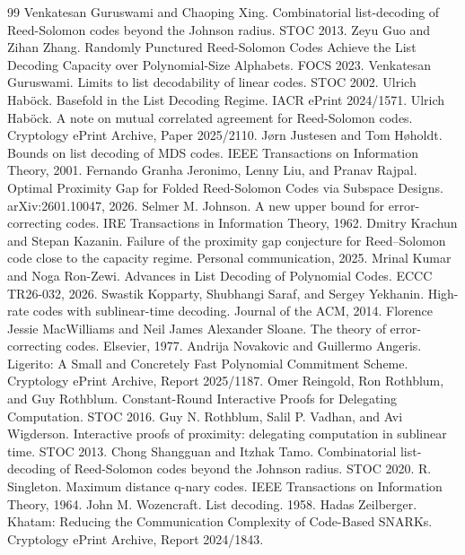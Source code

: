 \documentclass[11pt]{article}
\theoremstyle{plain}
\theoremstyle{definition}
\begin{document}
\begin{thebibliography}{99}
 Venkatesan Guruswami and Chaoping Xing. Combinatorial list-decoding of Reed-Solomon codes beyond the Johnson radius. STOC 2013.
 Zeyu Guo and Zihan Zhang. Randomly Punctured Reed-Solomon Codes Achieve the List Decoding Capacity over Polynomial-Size Alphabets. FOCS 2023.
 Venkatesan Guruswami. Limits to list decodability of linear codes. STOC 2002.
 Ulrich Hab\"ock. Basefold in the List Decoding Regime. IACR ePrint 2024/1571.
 Ulrich Hab\"ock. A note on mutual correlated agreement for Reed-Solomon codes. Cryptology ePrint Archive, Paper 2025/2110.
 J\o{}rn Justesen and Tom H\o{}holdt. Bounds on list decoding of MDS codes. IEEE Transactions on Information Theory, 2001.
 Fernando Granha Jeronimo, Lenny Liu, and Pranav Rajpal. Optimal Proximity Gap for Folded Reed-Solomon Codes via Subspace Designs. arXiv:2601.10047, 2026.
 Selmer M. Johnson. A new upper bound for error-correcting codes. IRE Transactions in Information Theory, 1962.
 Dmitry Krachun and Stepan Kazanin. Failure of the proximity gap conjecture for Reed--Solomon code close to the capacity regime. Personal communication, 2025.
 Mrinal Kumar and Noga Ron-Zewi. Advances in List Decoding of Polynomial Codes. ECCC TR26-032, 2026.
 Swastik Kopparty, Shubhangi Saraf, and Sergey Yekhanin. High-rate codes with sublinear-time decoding. Journal of the ACM, 2014.
 Florence Jessie MacWilliams and Neil James Alexander Sloane. The theory of error-correcting codes. Elsevier, 1977.
 Andrija Novakovic and Guillermo Angeris. Ligerito: A Small and Concretely Fast Polynomial Commitment Scheme. Cryptology ePrint Archive, Report 2025/1187.
 Omer Reingold, Ron Rothblum, and Guy Rothblum. Constant-Round Interactive Proofs for Delegating Computation. STOC 2016.
 Guy N. Rothblum, Salil P. Vadhan, and Avi Wigderson. Interactive proofs of proximity: delegating computation in sublinear time. STOC 2013.
 Chong Shangguan and Itzhak Tamo. Combinatorial list-decoding of Reed-Solomon codes beyond the Johnson radius. STOC 2020.
 R. Singleton. Maximum distance q-nary codes. IEEE Transactions on Information Theory, 1964.
 John M. Wozencraft. List decoding. 1958.
 Hadas Zeilberger. Khatam: Reducing the Communication Complexity of Code-Based SNARKs. Cryptology ePrint Archive, Report 2024/1843.
\end{thebibliography}
\end{document}
